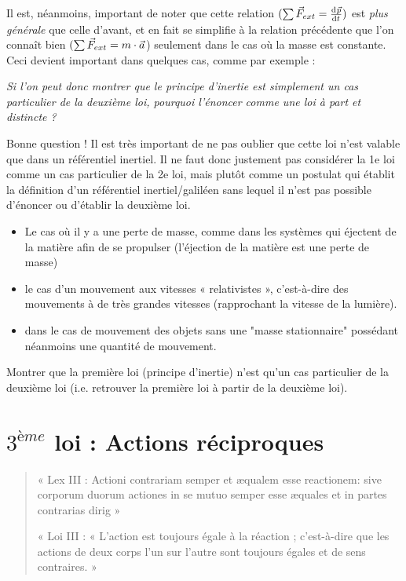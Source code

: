 \documentclass[11pt,a4paper]{article}
\begin{document}
Il est, néanmoins, important de noter que cette relation $(\sum \vec{F}_{ext} = \od{\vp}{t})$ est \textit{plus générale} que celle d’avant, et en fait se simplifie à la relation précédente que l’on connaît bien $(\sum \vec{F}_{ext} = m\cdot\vec{a}$) seulement dans le cas où la masse est constante. Ceci devient important dans quelques cas, comme par exemple : 

\begingroup
\setlength{\columnsep}{15pt}%
\setlength{\intextsep}{-10pt}%
\begin{table}
\begin{rmrq}
\small{ \emph{Si l’on peut donc montrer que le principe d’inertie est simplement un cas particulier de la deuxième loi, pourquoi l’énoncer comme une loi à part et distincte ? }

Bonne question ! Il est très important de ne pas oublier que cette loi n’est valable que dans un référentiel inertiel. Il ne faut donc justement pas considérer la 1e loi comme un cas particulier de la 2e loi, mais plutôt comme un postulat qui établit la définition d’un référentiel inertiel/galiléen sans lequel il n’est pas possible d’énoncer ou d’établir la deuxième loi.}
\end{rmrq}
\end{table}

\begin{itemize}
    \item Le cas où il y a une perte de masse, comme dans les systèmes qui éjectent de la matière afin de se propulser (l’éjection de la matière est une perte de masse)
    \item le cas d’un mouvement aux vitesses « relativistes », c’est-à-dire des mouvements à de très grandes vitesses (rapprochant la vitesse de la lumière).
    \item dans le cas de mouvement des objets sans une "masse stationnaire" possédant néanmoins une quantité de mouvement.
\end{itemize}

\begin{exo}
Montrer que la première loi (principe d’inertie) n’est qu’un cas particulier de la deuxième loi (i.e. retrouver la première loi à partir de la deuxième loi).  
\vspace{4.9cm}
\end{exo}
	
\endgroup	 

\section{$3^{ème}$ loi : Actions réciproques}
\begin{quote}
    \centering
    \small{« Lex III : Actioni contrariam semper et æqualem esse reactionem: sive corporum duorum actiones in se mutuo semper esse æquales et in partes contrarias dirig »}
    
    \small{« Loi III : « L'action est toujours égale à la réaction ; c'est-à-dire que les actions de deux corps l'un sur l'autre sont toujours égales et de sens contraires. »}
\end{quote}
\end{document}
